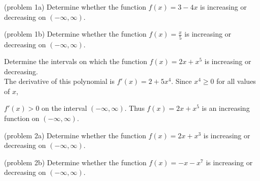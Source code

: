 \documentclass[handout]{ximera}
\begin{document}
\begin{problem}(problem 1a)
Determine whether the function $f(x) = 3 - 4x$ is increasing or decreasing on $(-\infty, \infty)$.\\
\begin{multipleChoice}
\end{multipleChoice}
\end{problem}

\begin{problem}(problem 1b)
Determine whether the function $f(x) = \frac{x}{5}$ is increasing or decreasing on $(-\infty, \infty)$.\\
\begin{multipleChoice}
\end{multipleChoice}
\end{problem}


\begin{example}[example 2]
Determine the intervals on which the function $f(x) = 2x + x^5$ is increasing or decreasing.\\
The derivative of this polynomial is $f'(x) = 2 + 5x^4$. Since $x^4 \geq 0$ for all values of $x$, 

$f'(x) > 0$ on the interval $(-\infty, \infty)$. Thus $f(x) = 2x + x^5$ is an increasing function on $(-\infty, \infty)$.

\end{example}

\begin{problem}(problem 2a)
Determine whether the function $f(x) = 2x + x^3$ is increasing or decreasing on $(-\infty, \infty)$.\\
\begin{multipleChoice}
\end{multipleChoice}
\end{problem}

\begin{problem}(problem 2b)
Determine whether the function $f(x) = -x - x^7$ is increasing or decreasing on $(-\infty, \infty)$.\\
\begin{multipleChoice}
\end{multipleChoice}
\end{problem}
\end{document}
